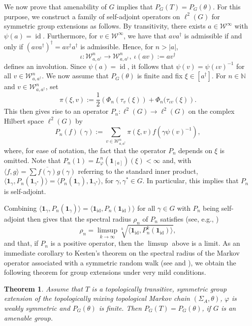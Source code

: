 \documentclass[10pt]{article}
\newtheorem{theorem}{Theorem}[section]
\theoremstyle{mystyle}
\newcommand{\N}{\mathbb{N}}
\newcommand{\cW}{\mathcal{W}}
\newcommand{\te}{{\theta}}
\newcommand{\1}{\mathbf{1}}
\DeclareMathOperator{\id}{id}
\begin{document}
We now prove that  amenability of $G$ implies that $P_G(T)=P_G(\te)$. For this purpose, we construct  a family of self-adjoint operators on $\ell^2(G)$ for symmetric group extensions as follows. By transitivity, there exists $a \in \cW^\infty$ with $\psi(a) = \id$. Furthermore, for $v \in \cW^\infty$, we have that $a v a^\dagger$ is admissible if and only if $(a v a^\dagger)^\dagger = a v^\dagger a^\dagger$ is admissible. Hence, for $n > |a|$,
\[\iota: \cW^{n}_{a,a^\dagger} \to \cW^{n}_{a,a^\dagger},\  \iota(av):=av^\dagger\]
 defines an involution. Since $\psi(a)=\id$, it follows that $\psi(v) = \psi(\iota v)^{-1}$ for all $v \in \cW^n_{a,a^\dagger}$.   
%
We now assume that $P_G(\te)$ is finite and fix $\xi \in [a^\dagger]$. For $n \in \N$ and $v \in \cW^n_{a,a^\dagger}$, set
 \[\pi{(\xi,v)} := \frac{1}{2}\left( \Phi_n(\tau_v(\xi)) +  \Phi_n(\tau_{\iota v}(\xi)\right).\] 
This then gives rise to an operator $P_n : \ell^2(G) \to \ell^2(G)$ on the complex Hilbert space $\ell^2(G)$ by
\[P_n(f)(\gamma) := \sum_{v \in \cW^n_{a, a^\dagger}}  \pi{(\xi,v)} f(\gamma \psi(v)^{-1}),\]
where, for ease of notation, the fact that the operator $P_n$ depends on $\xi$ is omitted.
Note that  $P_n(1) =  L^n_\varphi(\1_{[a]})(\xi) < \infty$ and, with $\langle f,g\rangle = \sum \overline{f(\gamma)}g(\gamma)$ referring to the standard inner product, $\langle \1_\gamma,P_n(\1_{\gamma^\ast})\rangle  =  \langle P_n(\1_{\gamma}),\1_{\gamma^\ast}\rangle$, for  $\gamma, \gamma^\ast \in G$. In particular, this implies that $P_n$ is self-adjoint.  

Combining $\langle \1_\gamma,P_n(\1_{\gamma})\rangle = \langle \1_{\id},P_n(\1_{\id})\rangle$ for all $\gamma \in G$ with $P_n$ being self-adjoint then gives that the spectral radius $\rho_n$ of $P_n$ satisfies (see, e.g., \cite{KaimanovichVershik:1983})  
\[ \rho_n = \limsup_{k \to \infty} \sqrt[k]{\langle \1_{\id},P^k_n(\1_{\id})\rangle},\]
and that, if $P_n$ is a positive operator, then the $\limsup$ above is a limit. As an immediate corollary to Kesten's theorem on the spectral radius of the Markov operator associated with a symmetric random walk (see \cite{Kesten:1959a} and \cite[Theorem 5]{KaimanovichVershik:1983}), we obtain the following theorem for group extensions under very mild conditions.
 

\begin{theorem}\label{theo:Kesten_pt1}
Assume that $T$ is a topologically transitive, symmetric group extension of the topologically mixing topological Markov chain $(\Sigma_A,\te)$, $\varphi$ is  weakly symmetric and $P_G(\te)$ is finite. 
Then $P_G(T)=P_G(\te)$, if $G$ is an amenable group.
\end{theorem}
\end{document}

